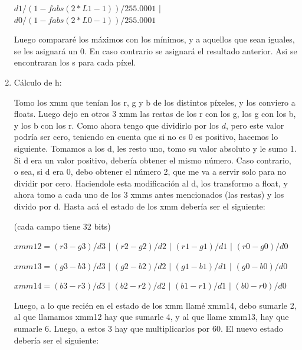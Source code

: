 \documentclass[a4paper]{article}
\begin{document}
\begin{enumerate}
\hspace*{1.75cm}$d1 / (1 - fabs(2*L1 - 1)) / 255.0001$ $|$ $ d0/ (1 - fabs( 2*L0 - 1)) / 255.0001$

\vspace*{0.3cm}
	
Luego compararé los máximos con los mínimos, y a aquellos que sean iguales, se les asignará un 0. En caso contrario se asignará el resultado anterior. Asi se encontraran los s para cada píxel.

	\item Cálculo de h:

	Tomo los xmm que tenían los r, g y b de los distintos píxeles, y los conviero a floats. Luego dejo en otros 3 xmm las restas de los r con los g, los g con los b, y los b con los r. Como ahora tengo que dividirlo por los $d$, pero este valor podría ser cero, teniendo en cuenta que si no es 0 es positivo, hacemos lo siguiente. Tomamos a los d, les resto uno, tomo su valor absoluto y le sumo 1. Si d era un valor positivo, debería obtener el mismo número. Caso contrario, o sea, si d era 0, debo obtener el número 2, que me va a servir solo para no dividir por cero. Haciendole esta modificación al d, los transformo a float, y ahora tomo a cada uno de los 3 xmms antes mencionados (las restas) y los divido por d. Hasta acá el estado de los xmm debería ser el siguiente:
	
\vspace*{0.3cm}

(cada campo tiene 32 bits)	
	
\vspace*{0.3cm}	

$xmm12=(r3-g3)/d3$ $|$ $(r2-g2)/d2$ $|$ $(r1-g1)/d1$ $|$ $(r0-g0)/d0$

\vspace*{0.3cm} 
 
$xmm13=(g3-b3)/d3$ $|$ $(g2-b2)/d2$ $|$ $(g1-b1)/d1$ $|$ $(g0-b0)/d0$

\vspace*{0.3cm}

$xmm14=(b3-r3)/d3$ $|$ $(b2-r2)/d2$ $|$ $(b1-r1)/d1$ $|$ $(b0-r0)/d0$	
	
\vspace*{0.3cm}
	
	Luego, a lo que recién en el estado de los xmm llamé xmm14, debo sumarle 2, al que llamamos xmm12 hay que sumarle 4, y al que llame xmm13, hay que sumarle 6. Luego, a estos 3 hay que multiplicarlos por 60. El nuevo estado debería ser el siguiente:
	

\end{enumerate}
\end{document}
